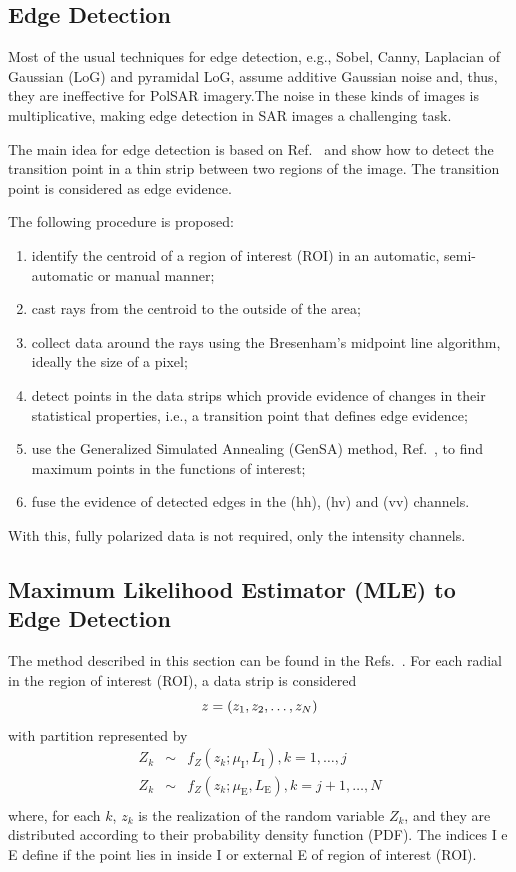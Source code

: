 \documentclass[conference]{IEEEtran}
\begin{document}
\subsection{Edge Detection}

Most of the usual techniques for edge detection, e.g., 
Sobel, Canny, Laplacian of Gaussian (LoG) and pyramidal LoG, assume additive Gaussian noise and, thus, they are ineffective for PolSAR imagery.The noise in these kinds of images is multiplicative, making edge detection in SAR images a challenging task.

The main idea for edge detection is based on Ref.~\cite{nhfc, gmbf} and show how to detect the transition point in a thin strip between two regions of the image. The transition point is considered as edge evidence. 

The following procedure is proposed:
\begin{enumerate}
	\item identify the centroid of a region of interest (ROI) in an automatic, semi-automatic or manual manner;
	\item cast rays from the centroid to the outside of the area;
	\item collect data around the rays using the  Bresenham's midpoint line algorithm, ideally the size of a pixel;
	\item detect points in the data strips which provide evidence of changes in their statistical properties, i.e., a transition point that defines edge evidence;
	\item use the Generalized Simulated Annealing (GenSA) method, Ref.~\cite{xgsh}, to find maximum points in the functions of interest;
	\item fuse the evidence of detected edges in the (hh), (hv) and (vv) channels.
\end{enumerate}
With this, fully polarized data is not required, only the intensity channels.

\subsection{Maximum Likelihood Estimator (MLE) to Edge Detection}

The method described in this section can be found in the Refs.~\cite{gmbf,nhfc}. For each radial in the region of interest (ROI), a data strip is considered
\begin{equation}\nonumber
	z = (z_1,z_2,\dots,z_N) \\
\end{equation}
with partition represented by
\begin{equation}\label{func_max_ver_uni_gamma} 
\begin{array}{lll}
	Z_k&\sim& f_Z(z_k;\mu_\text{I},L_\text{I}), k=1,\dots,j\\
	Z_k&\sim& f_Z(z_k;\mu_\text{E},L_\text{E}), k=j+1,\dots,N\\
\end{array}
\end{equation}
where, for each $k$, $z_k$ is the realization of the random variable $Z_k$, and they are distributed according to their probability density function (PDF). The indices I e E define if the point lies in inside I or external E of region of interest (ROI).
\end{document}

